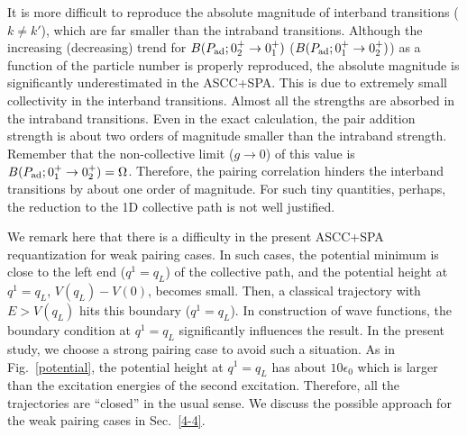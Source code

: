 \documentclass[11pt]{book} %
\begin{document}
It is more difficult to reproduce the absolute magnitude of
interband transitions ($k\neq k'$), 
which are far smaller than the intraband transitions.
Although the increasing (decreasing) trend for
$B(P_{\rm ad};0_2^+\rightarrow 0_1^+)$
($B(P_{\rm ad};0_1^+\rightarrow 0_2^+)$)
as a function of the particle number is properly reproduced,
the absolute magnitude is significantly underestimated in the ASCC+SPA.
This is due to extremely small collectivity in the interband transitions.
Almost all the strengths are absorbed in the intraband transitions.
Even in the exact calculation, the pair addition strength is
about two orders of magnitude smaller than the intraband strength.
Remember that the non-collective limit ($g\rightarrow 0$) of this
value is $B(P_{\rm ad};0_1^+\rightarrow 0_2^+)=\Omega$.
Therefore, the pairing correlation hinders the interband transitions
by about one order of magnitude.
For such tiny quantities, perhaps, 
the reduction to the 1D collective path is not well justified.



We remark here that there is a difficulty in the present ASCC+SPA
requantization for weak pairing cases.
In such cases, the potential minimum is close to the left end 
($q^1=q_L$) of the collective path, and the potential height
at $q^1=q_L$, $V(q_L) - V(0)$, becomes small.
Then, a classical trajectory with $E>V(q_L)$ hits this boundary ($q^1=q_L$).
In construction of wave functions,
the boundary condition at $q^1=q_L$ significantly influences the result.
In the present study, we choose a strong pairing case to avoid
such a situation.
As in Fig.~\ref{potential}, the potential height at $q^1=q_L$ has
about $10\epsilon_0$ which is larger than the excitation energies
of the second excitation.
Therefore, all the trajectories are ``closed'' in the usual sense.
We discuss the possible approach for the weak pairing cases in Sec.~\ref{4-4}.
\end{document}

